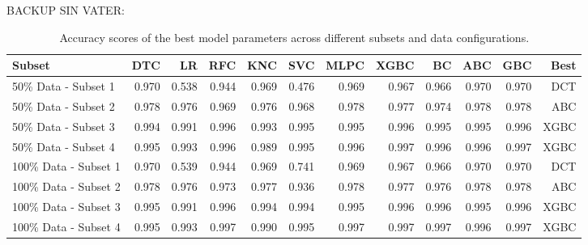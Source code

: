 BACKUP SIN VATER:



\begin{table}[ht]
\centering
\begin{tabular}{lrrrrrrrrrr|r}
\toprule

Subset & DTC & LR & RFC & KNC & SVC & MLPC & XGBC & BC & ABC & GBC &Best \\
\midrule
50\% Data - Subset 1  & 0.970 & 0.538 & 0.944 & 0.969 & 0.476 & 0.969 & 0.967 & 0.966 & 0.970 & 0.970 & DCT \\
50\% Data - Subset 2  & 0.978 & 0.976 & 0.969 & 0.976 & 0.968 & 0.978 & 0.977 & 0.974 & 0.978 & 0.978 & ABC \\
50\% Data - Subset 3  & 0.994 & 0.991 & 0.996 & 0.993 & 0.995 & 0.995 & 0.996 & 0.995 & 0.995 & 0.996 & XGBC \\
50\% Data - Subset 4  & 0.995 & 0.993 & 0.996 & 0.989 & 0.995 & 0.996 & 0.997 & 0.996 & 0.996 & 0.997 & XGBC \\

100\% Data - Subset 1 & 0.970 & 0.539 & 0.944 & 0.969 & 0.741 & 0.969 & 0.967 & 0.966 & 0.970 & 0.970 & DCT \\
100\% Data - Subset 2 & 0.978 & 0.976 & 0.973 & 0.977 & 0.936 & 0.978 & 0.977 & 0.976 & 0.978 & 0.978 & ABC \\
100\% Data - Subset 3 & 0.995 & 0.991 & 0.996 & 0.994 & 0.994 & 0.995 & 0.996 & 0.996 & 0.995 & 0.996 & XGBC \\
100\% Data - Subset 4 & 0.995 & 0.993 & 0.997 & 0.990 & 0.995 & 0.997 & 0.997 & 0.997 & 0.996 & 0.997 & XGBC \\
\bottomrule
\end{tabular}
\caption{Accuracy scores of the best model parameters across different subsets and data configurations.}
\label{tab:accuracy_scores}
\end{table}





